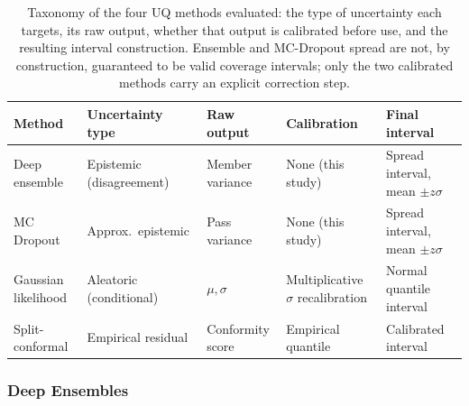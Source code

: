 \documentclass[a4paper,fleqn]{cas-sc}
\begin{document}
\begin{table}[t]
\centering
\caption{Taxonomy of the four UQ methods evaluated: the type of uncertainty each targets, its raw output, whether that output is calibrated before use, and the resulting interval construction. Ensemble and MC-Dropout spread are not, by construction, guaranteed to be valid coverage intervals; only the two calibrated methods carry an explicit correction step.}
\label{tab:uq-taxonomy}
\begin{tabular}{lllll}
\toprule
\textbf{Method} & \textbf{Uncertainty type} & \textbf{Raw output} & \textbf{Calibration} & \textbf{Final interval} \\
\midrule
Deep ensemble & Epistemic (disagreement) & Member variance & None (this study) & Spread interval, mean $\pm z\sigma$ \\
MC Dropout & Approx.\ epistemic & Pass variance & None (this study) & Spread interval, mean $\pm z\sigma$ \\
Gaussian likelihood & Aleatoric (conditional) & $\mu, \sigma$ & Multiplicative $\sigma$ recalibration & Normal quantile interval \\
Split-conformal & Empirical residual & Conformity score & Empirical quantile & Calibrated interval \\
\bottomrule
\end{tabular}
\end{table}

\subsubsection{Deep Ensembles}
\end{document}
